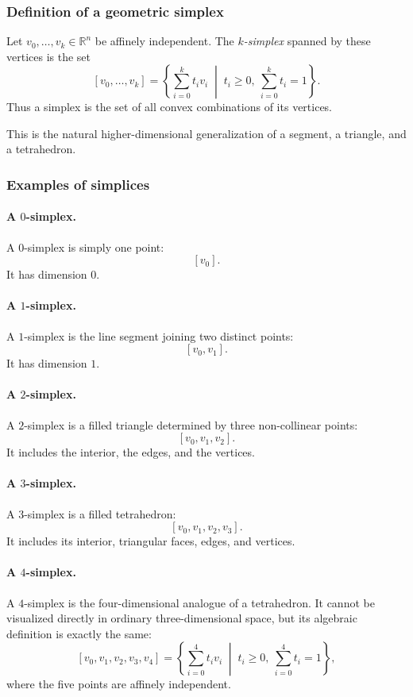 \documentclass[12pt,a4paper]{article}
\theoremstyle{notespace}
\begin{document}
\subsubsection{Definition of a geometric simplex}

Let \(v_0,\dots,v_k\in \mathbb{R}^n\) be affinely independent. The \emph{\(k\)-simplex} spanned by these vertices is the set
\[
[v_0,\dots,v_k]
=
\left\{
\sum_{i=0}^k t_i v_i
\;\middle|\;
t_i\ge 0,\ \sum_{i=0}^k t_i=1
\right\}.
\]
Thus a simplex is the set of all convex combinations of its vertices.

This is the natural higher-dimensional generalization of a segment, a triangle, and a tetrahedron.

\subsubsection{Examples of simplices}

\paragraph{A \(0\)-simplex.}
A \(0\)-simplex is simply one point:
\[
[v_0].
\]
It has dimension \(0\).

\paragraph{A \(1\)-simplex.}
A \(1\)-simplex is the line segment joining two distinct points:
\[
[v_0,v_1].
\]
It has dimension \(1\).

\paragraph{A \(2\)-simplex.}
A \(2\)-simplex is a filled triangle determined by three non-collinear points:
\[
[v_0,v_1,v_2].
\]
It includes the interior, the edges, and the vertices.

\paragraph{A \(3\)-simplex.}
A \(3\)-simplex is a filled tetrahedron:
\[
[v_0,v_1,v_2,v_3].
\]
It includes its interior, triangular faces, edges, and vertices.

\paragraph{A \(4\)-simplex.}
A \(4\)-simplex is the four-dimensional analogue of a tetrahedron. It cannot be visualized directly in ordinary three-dimensional space, but its algebraic definition is exactly the same:
\[
[v_0,v_1,v_2,v_3,v_4]
=
\left\{
\sum_{i=0}^4 t_i v_i
\;\middle|\;
t_i\ge 0,\ \sum_{i=0}^4 t_i=1
\right\},
\]
where the five points are affinely independent.
\end{document}

